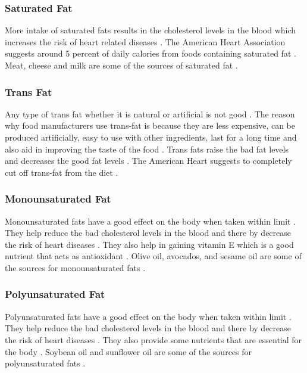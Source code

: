 \documentclass[sigconf]{acmart}
\begin{document}
\subsubsection{Saturated Fat}
More intake of saturated fats results in the cholesterol levels in the blood which increases the risk of heart related diseases \cite{www-health}. The American Heart Association suggests around 5 percent of daily calories from foods containing saturated fat \cite{www-health}. Meat, cheese and milk are some of the sources of saturated fat \cite{www-health}. 

\subsubsection{Trans Fat}
Any type of trans fat whether it is natural or artificial is not good \cite{www-health}. The reason why food manufacturers use trans-fat is because they are less expensive, can be produced artificially, easy to use with other ingredients, last for a long time and also aid in improving the taste of the food \cite{www-health}. Trans fats raise the bad fat levels and decreases the good fat levels \cite{www-health}. The American Heart suggests to completely cut off trans-fat from the diet \cite{www-health}.

\subsubsection{Monounsaturated Fat}
Monounsaturated fats have a good effect on the body when taken within limit \cite{www-health}. They help reduce the bad cholesterol levels in the blood and there by decrease the risk of heart diseases \cite{www-health}. They also help in gaining vitamin E which is a good nutrient that acts as antioxidant \cite{www-health}. Olive oil, avocados, and sesame oil are some of the sources for monounsaturated fats \cite{www-health}.

\subsubsection{Polyunsaturated Fat}
Polyunsaturated fats have a good effect on the body when taken within limit \cite{www-health}. They help reduce the bad cholesterol levels in the blood and there by decrease the risk of heart diseases \cite{www-health}. They also provide some nutrients that are essential for the body \cite{www-health}. Soybean oil and sunflower oil are some of the sources for polyunsaturated fats \cite{www-health}.
\end{document}
